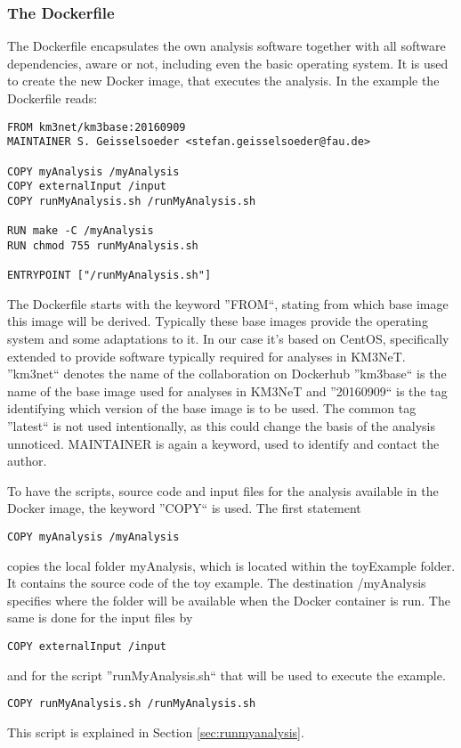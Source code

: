 \documentclass[a4paper, twoside, 11pt]{article}
\begin{document}
\subsubsection{The Dockerfile}
\label{sec:dockerfile}

The Dockerfile encapsulates the own analysis software together 
with all software dependencies, aware or not, 
including even the basic operating system.
It is used to create the new Docker image, that executes the analysis. 
In the example the Dockerfile reads: 
\begin{lstlisting}[basicstyle=\ttfamily\small,upquote=true,columns=flexible,keepspaces=true,frame=single]
FROM km3net/km3base:20160909
MAINTAINER S. Geisselsoeder <stefan.geisselsoeder@fau.de>

COPY myAnalysis /myAnalysis
COPY externalInput /input
COPY runMyAnalysis.sh /runMyAnalysis.sh

RUN make -C /myAnalysis
RUN chmod 755 runMyAnalysis.sh

ENTRYPOINT ["/runMyAnalysis.sh"]
\end{lstlisting}
The Dockerfile starts with the keyword ''FROM``, 
stating from which base image this image will be derived.
Typically these base images provide the operating system and some adaptations to it. 
In our case it's based on CentOS, 
specifically extended to provide software typically required for analyses in KM3NeT. 
''km3net`` denotes the name of the collaboration on Dockerhub\cite{dockerhub:km3net}
''km3base`` is the name of the base image used for analyses in KM3NeT and 
''20160909`` is the tag identifying which version of the base image is to be used. 
The common tag ''latest`` is not used intentionally, as this could change the basis of the analysis unnoticed. 
MAINTAINER is again a keyword, used to identify and contact the author. 

\label{sec:addingYourCode}
To have the scripts, source code and input files for the analysis available in the Docker image, the keyword ''COPY`` is used.
The first statement 
\begin{lstlisting}[basicstyle=\ttfamily\small,upquote=true,columns=flexible,keepspaces=true,frame=single]
COPY myAnalysis /myAnalysis
\end{lstlisting}
copies the local folder myAnalysis, which is located within the toyExample folder. 
It contains the source code of the toy example.
The destination /myAnalysis specifies where the folder will be available when the Docker container is run. 
The same is done for the input files by
\begin{lstlisting}[basicstyle=\ttfamily\small,upquote=true,columns=flexible,keepspaces=true,frame=single]
COPY externalInput /input 
\end{lstlisting}
and for the script ''runMyAnalysis.sh`` that will be used to execute the example. 
\begin{lstlisting}[basicstyle=\ttfamily\small,upquote=true,columns=flexible,keepspaces=true,frame=single]
COPY runMyAnalysis.sh /runMyAnalysis.sh
\end{lstlisting}
This script is explained in Section \ref{sec:runmyanalysis}.
\end{document}

